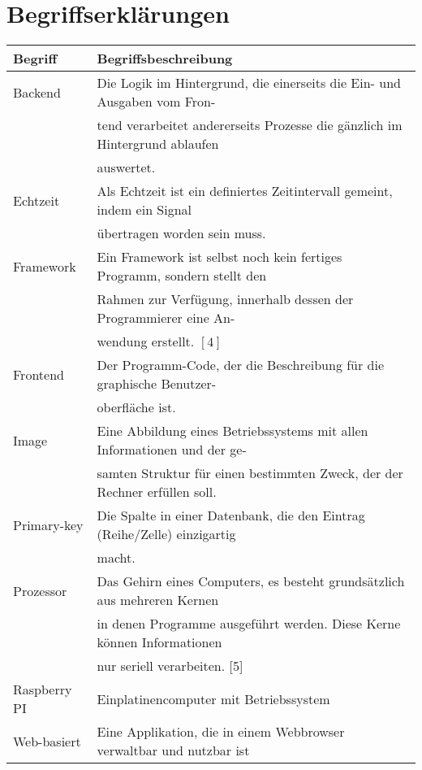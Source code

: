 \section*{Begriffserklärungen}
\begin{table}[H]
    \begin{tabular}{l|l}
         \textbf{Begriff}& \textbf{Begriffsbeschreibung}\\
         \hline
         Backend&               Die Logik im Hintergrund, die einerseits die Ein- und Ausgaben vom Fron-\\
         &                      tend verarbeitet andererseits Prozesse die gänzlich im Hintergrund ablaufen\\
         &                      auswertet.\\
         Echtzeit&              Als Echtzeit ist ein definiertes Zeitintervall gemeint, indem ein Signal\\
         &                      übertragen worden sein muss.\\
         Framework&             Ein Framework ist selbst noch kein fertiges Programm, sondern stellt den\\
         &                      Rahmen zur Verfügung, innerhalb dessen der Programmierer eine An-\\
         &                      wendung erstellt. $[4]$\\
         Frontend&              Der Programm-Code, der die Beschreibung für die graphische Benutzer-\\
         &                      oberfläche ist.\\
         Image&                 Eine Abbildung eines Betriebssystems mit allen Informationen und der ge-\\
         &                      samten Struktur für einen bestimmten Zweck, der der Rechner erfüllen soll.\\     
         Primary-key&           Die Spalte in einer Datenbank, die den Eintrag (Reihe/Zelle) einzigartig\\
         &                      macht.\\
         Prozessor&             Das Gehirn eines Computers, es besteht grundsätzlich aus mehreren Kernen\\
         &                      in denen Programme ausgeführt werden. Diese Kerne können Informationen\\
         &                      nur seriell verarbeiten. [5]\\
         Raspberry PI&          Einplatinencomputer mit Betriebssystem\\
         Web-basiert&           Eine Applikation, die in einem Webbrowser verwaltbar und nutzbar ist\\
    \end{tabular}
    \label{tab:begriffserklaerungen}
\end{table}